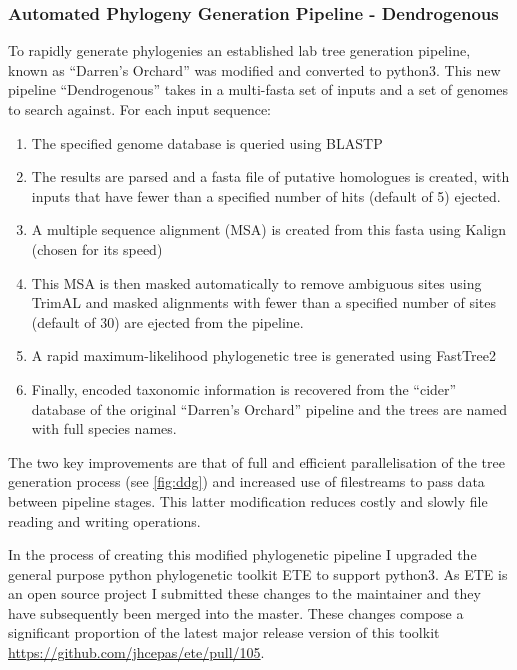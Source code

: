 \subsubsection{Automated Phylogeny Generation Pipeline - Dendrogenous}
To rapidly generate phylogenies an established lab tree generation pipeline, known as ``Darren's Orchard'' 
\citep{Richards2009g} was modified and converted to python3.  This new pipeline ``Dendrogenous'' 
takes in a multi-fasta set of inputs and a set of genomes to search against.
For each input sequence:
\begin{enumerate} 
    \item The specified genome database is queried using BLASTP
    \item The results are parsed and a fasta file of putative homologues is created, with inputs that have fewer than a specified 
        number of hits (default of 5) ejected.
    \item A multiple sequence alignment (MSA) is created from this fasta using Kalign (chosen for its speed) \citep{Lassmann2009}
    \item This MSA is then masked automatically to remove ambiguous sites using TrimAL \citep{Capella-Gutierrez2009} and masked alignments
        with fewer than a specified number of sites (default of 30) are ejected from the pipeline.
    \item A rapid maximum-likelihood phylogenetic tree is generated using FastTree2 \citep{Price2010}
    \item Finally, encoded taxonomic information is recovered from the ``cider'' database of the original ``Darren's Orchard'' pipeline 
        and the trees are named with full species names.
\end{enumerate}
The two key improvements are that of full and efficient parallelisation of the tree generation process (see \ref{fig:ddg})
and increased use of filestreams to pass data between pipeline stages.  This latter modification reduces costly and slowly
file reading and writing operations.

In the process of creating this modified phylogenetic pipeline I upgraded the general purpose python phylogenetic toolkit
ETE \citep{Huerta-Cepas2010} to support python3.  As ETE is an open source project I submitted these changes
to the maintainer and they have subsequently been merged into the master.  These changes compose a significant proportion of
the latest major release version of this toolkit \url{https://github.com/jhcepas/ete/pull/105}.

